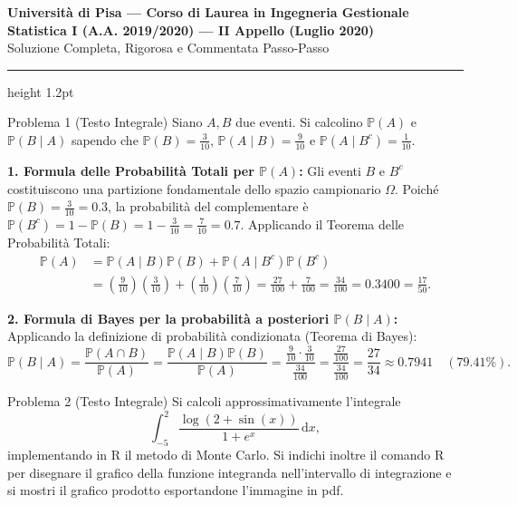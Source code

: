 \documentclass[11pt,a4paper]{article}
\newcommand{\Prob}{\mathbb{P}}
\newcommand{\dx}{\mathrm{d}x}
\begin{document}
\begin{center}
    {\LARGE\bfseries\color{navyblue} Università di Pisa --- Corso di Laurea in Ingegneria Gestionale}\\[0.4em]
    {\Large\bfseries Statistica I (A.A. 2019/2020) --- II Appello (Luglio 2020)}\\[0.3em]
    {\large\textsf{Soluzione Completa, Rigorosa e Commentata Passo-Passo}}
\end{center}
\vspace{0.5em}
\hrule height 1.2pt
\vspace{1.5em}

\begin{problemabox}{Problema 1 (Testo Integrale)}
Siano $A,B$ due eventi. Si calcolino $\Prob(A)$ e $\Prob(B \mid A)$ sapendo che $\Prob(B)=\frac{3}{10}$, $\Prob(A \mid B)=\frac{9}{10}$ e $\Prob(A \mid B^c)=\frac{1}{10}$.
\end{problemabox}

\begin{soluzionebox}
\textbf{1. Formula delle Probabilità Totali per $\Prob(A)$:}
Gli eventi $B$ e $B^c$ costituiscono una partizione fondamentale dello spazio campionario $\Omega$.
Poiché $\Prob(B) = \frac{3}{10} = 0.3$, la probabilità del complementare è $\Prob(B^c) = 1 - \Prob(B) = 1 - \frac{3}{10} = \frac{7}{10} = 0.7$.
Applicando il Teorema delle Probabilità Totali:
\begin{align*}
\Prob(A) &= \Prob(A \mid B)\Prob(B) + \Prob(A \mid B^c)\Prob(B^c) \\
&= \left(\frac{9}{10}\right)\left(\frac{3}{10}\right) + \left(\frac{1}{10}\right)\left(\frac{7}{10}\right) = \frac{27}{100} + \frac{7}{100} = \frac{34}{100} = \bm{0.3400} = \frac{17}{50}.
\end{align*}

\textbf{2. Formula di Bayes per la probabilità a posteriori $\Prob(B \mid A)$:}
Applicando la definizione di probabilità condizionata (Teorema di Bayes):
\[
\Prob(B \mid A) = \frac{\Prob(A \cap B)}{\Prob(A)} = \frac{\Prob(A \mid B)\Prob(B)}{\Prob(A)} = \frac{\frac{9}{10} \cdot \frac{3}{10}}{\frac{34}{100}} = \frac{\frac{27}{100}}{\frac{34}{100}} = \frac{27}{34} \approx \bm{0.7941} \quad (\bm{79.41\%}).
\]
\end{soluzionebox}

\begin{problemabox}{Problema 2 (Testo Integrale)}
Si calcoli approssimativamente l'integrale
\[
\int_{-5}^2 \frac{\log(2 + \sin(x))}{1 + e^x} \, \dx,
\]
implementando in R il metodo di Monte Carlo. Si indichi inoltre il comando R per disegnare il grafico della funzione integranda nell'intervallo di integrazione e si mostri il grafico prodotto esportandone l'immagine in pdf.
\end{problemabox}
\end{document}

